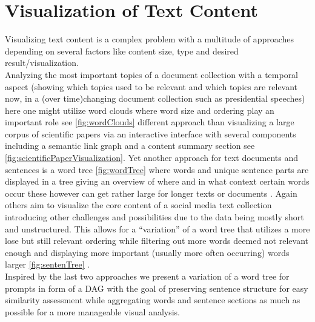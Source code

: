 \documentclass[
  a4paper,  %
  twoside,  %
  bibliography=totoc,
  headsepline,
  cleardoublepage=empty,
  parskip=half,
  draft=false
]{scrbook}
\begin{document}
\section{Visualization of Text Content}
Visualizing text content is a complex problem with a multitude of approaches depending on several factors like content size, type and desired result/visualization.\\
Analyzing the most important topics of a document collection with a temporal aspect (showing which topics used to be relevant and which topics are relevant now, in a (over time)changing document collection such as presidential speeches) here one might utilize word clouds where word size and ordering play an important role see \cref{fig:wordClouds}  \cite{wordclouds}  different approach than visualizing a large corpus of scientific papers via an interactive interface with several components including a semantic link graph and a content summary section see \cref{fig:scientificPaperVisualization}\cite{visualizingPaperCollections}. Yet another approach for text documents and sentences is a word tree \cref{fig:wordTree} where words and unique sentence parts are displayed in a tree giving an overview of where and in what context certain words occur these however can get rather large for longer texts or documents \cite{wordTree}. Again others aim to visualize the core content of a social media text collection introducing other challenges and possibilities due to the data being mostly short and unstructured. This allows for a \enquote{variation} of a word tree that utilizes a more lose but still relevant ordering while filtering out more words deemed not relevant enough and displaying more important (usually more often occurring) words larger \cref{fig:sentenTree} \cite{sentenTree}.\\ 
Inspired by the last two approaches we present a variation of a word tree for prompts in form of a DAG with the goal of preserving sentence structure for easy similarity assessment while aggregating words and sentence sections as much as possible for a more manageable visual analysis.
\end{document}
